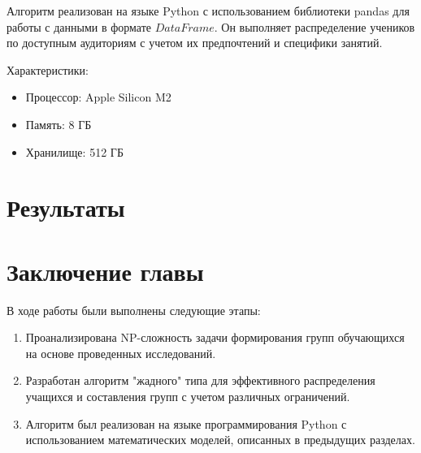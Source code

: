 Алгоритм реализован на языке Python с использованием библиотеки pandas для работы с данными в формате $DataFrame$. Он выполняет распределение учеников по доступным аудиториям с учетом их предпочтений и специфики занятий. 

Характеристики:
\begin{itemize}
    \item Процессор: Apple Silicon M2
    \item Память: 8 ГБ
    \item Хранилище: 512 ГБ
\end{itemize}


\section{Результаты}



\section{Заключение главы}
В ходе работы были выполнены следующие этапы:

\begin{enumerate}
    \item Проанализирована NP-сложность задачи формирования групп обучающихся на основе проведенных исследований.
    \item Разработан алгоритм "жадного" типа для эффективного распределения учащихся и составления групп с учетом различных ограничений.
    \item Алгоритм был реализован на языке программирования Python с использованием математических моделей, описанных в предыдущих разделах.
\end{enumerate}

